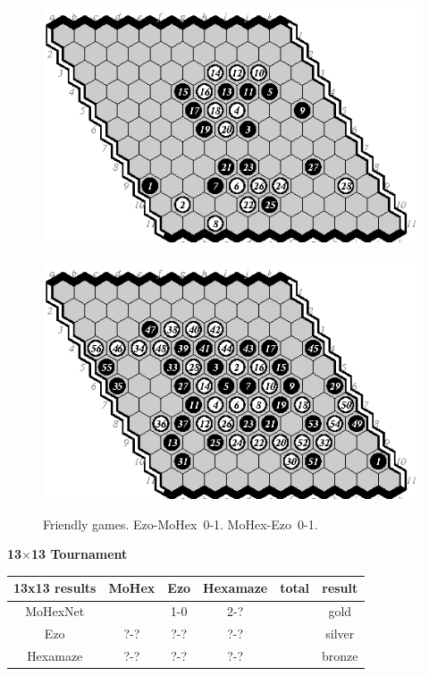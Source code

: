 \documentclass{icga}
\def\Eo{\mbox{\sc Ezo}}
\def\Hz{\mbox{\sc Hexamaze}}
\def\Mx{\mbox{\sc MoHex}}
\def\Mt{\mbox{\sc MoHexNet}}
\begin{document}
\begin{figure}[hbp]
\includegraphics[scale=1.3]{games/pix/em-friendly-0-1.eps}\hspace*{-1cm}\
\includegraphics[scale=1.3]{games/pix/me-friendly-0-1.eps}
\caption{Friendly games. \Eo-\Mx\ 0-1. \Mx-\Eo\ 0-1.}
\end{figure}

\newpage
{\large\bf 13$\times$13 Tournament}

\hfill\begin{tabular}{|c|c|c|c|c|c|}
\hline 13x13 results &\Mx{} &\Eo{}  &\Hz{} & total & result \\ 
\hline \Mt{}         &      &  1-0  & 2-?  &       & gold \\
\hline \Eo{}         &  ?-? &  ?-?  & ?-?  &       & silver \\
\hline \Hz{}         &  ?-? &  ?-?  & ?-?  &       & bronze \\
\hline
\end{tabular}\hfill~
\end{document}
